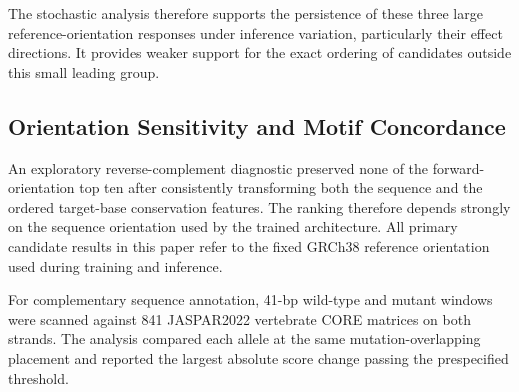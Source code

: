 \documentclass[10pt,letterpaper,twocolumn]{article}
\begin{document}
\begin{table}[t]
\centering
\caption{\textbf{Monte Carlo dropout stability of the three
full-cohort case studies.} Intervals are empirical 5th--95th
percentiles across 50 passes.}
\label{tab:mc-dropout-stability}
\end{table}

The stochastic analysis therefore supports the persistence of these
three large reference-orientation responses under inference variation,
particularly their effect directions. It provides weaker support for
the exact ordering of candidates outside this small leading group.

\subsection{Orientation Sensitivity and Motif Concordance}

An exploratory reverse-complement diagnostic preserved none of the
forward-orientation top ten after consistently transforming both the
sequence and the ordered target-base conservation features. The
ranking therefore depends strongly on the sequence orientation used by
the trained architecture. All primary candidate results in this paper
refer to the fixed GRCh38 reference orientation used during training
and inference.

For complementary sequence annotation, 41-bp wild-type and mutant
windows were scanned against 841 JASPAR2022 vertebrate CORE matrices on
both strands. The analysis compared each allele at the same
mutation-overlapping placement and reported the largest absolute score
change passing the prespecified threshold.

\begin{table}[H]
\centering
\caption{\textbf{Largest mutation-overlapping JASPAR score changes for
the three full-cohort case studies.}}
\label{tab:jaspar-top3}
\small
{}
\end{table}
\end{document}
